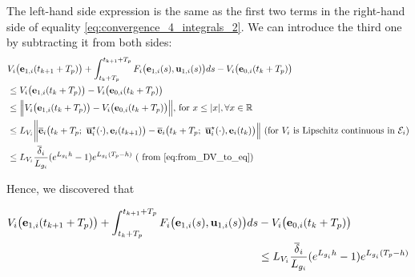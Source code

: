 \begin{gg_box}
  The left-hand side expression is the same as the first two terms in the
  right-hand side of equality \eqref{eq:convergence_4_integrals_2}. We can
  introduce the third one by subtracting it from both sides:
  \begin{align}
    &V_i\big(\vect{e}_{1,i}(t_{k+1} + T_p)\big)
    + \int_{t_k + T_p}^{t_{k+1} + T_p} F_i\big(\vect{e}_{1,i}(s), \vect{u}_{1,i}(s)\big) ds
    - V_i\big(\vect{e}_{0,i}(t_k + T_p)\big) \\
    &\leq V_i\big(\vect{e}_{1,i}(t_k + T_p)\big)
    - V_i\big(\vect{e}_{0,i}(t_k + T_p)\big) \\
    &\leq \Big\|V_i\big(\vect{e}_{1,i}(t_k + T_p)\big)
    - V_i\big(\vect{e}_{0,i}(t_k + T_p)\big)\Big\| \text{, for } x \leq |x|, \forall x \in \mathbb{R} \\
    &\leq L_{V_i}\bigg \|\overline{\vect{e}}_i\big(t_k + T_p;\ \overline{\vect{u}}_i^{\star}(\cdot), \vect{e}_i(t_{k+1})\big)
    - \overline{\vect{e}}_i\big(t_k + T_p;\ \overline{\vect{u}}_i^{\star}(\cdot), \vect{e}_i(t_k) \big)\Big\|
    \text{ (for } V_i \text{ is Lipschitz continuous in } \mathcal{E}_i \text{)} \\
    &\leq L_{V_i} \dfrac{\overline{\delta}_i}{L_{g_i}} (e^{L_{g_i}h} - 1) e^{L_{g_i} (T_p - h)} \text{ ( from \eqref{eq:from_DV_to_eq})}
  \end{align}
\end{gg_box}
Hence, we discovered that
\begin{bw_box}
\begin{align}
  V_i\big(\bm{\mathbf{e}}_{1,i}(t_{k+1} + T_p)\big)
  + \int_{t_k + T_p}^{t_{k+1} + T_p} F_i\big(\bm{\mathbf{e}}_{1,i}(s), \bm{\mathbf{u}}_{1,i}(s)\big) ds
  &- V_i\big(\bm{\mathbf{e}}_{0,i}(t_k + T_p)\big) \\
  &\leq L_{V_i}\dfrac{\overline{\delta}_i}{L_{g_i}} (e^{L_{g_i}h} - 1) e^{L_{g_i} (T_p - h)}
  \label{eq:end_result_diff_V_plus_int}
\end{align}
\end{bw_box}

